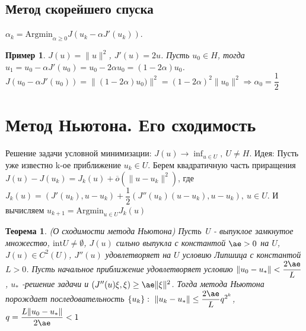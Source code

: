 \documentclass[9pt, a4paper]{extarticle}
\newtheorem*{theorem}{Теорема}
\newtheorem*{sample}{Пример}
\begin{document}
	\subsection*{Метод скорейшего спуска}
	$\alpha_k = \text{Argmin}_{\alpha \geq 0} J(u_k - \alpha J'(u_k))$. 
	\begin{sample}
		$J(u) = \|u\|^2$, $J'(u) = 2 u$. Пусть $u_0 \in H$, тогда $ u_1 = u_0 - \alpha J'(u_0) = u_0 - 2 \alpha u_0 = (1- 2\alpha) u_0$. $J(u_0 - \alpha J'(u_0)) = \|(1- 2\alpha )u_0)\|^2 = (1-2\alpha)^2 \|u_0\|^2 \Rightarrow \alpha_0 = \dfrac12$
	\end{sample}
\section{Метод Ньютона. Его сходимость}
	Решение задачи условной минимизации: $J(u) \to \inf_{u\in U}, \ U \neq H$. \newline
	Идея: Пусть уже известно k-ое приближение $u_k \in U$. Берем квадратичную часть приращения $J(u) - J(u_k) = J_k(u) + \overline{o}(\|u- u_k\|^2)$, где $J_k(u) = (J'(u_k), u - u_k) + \dfrac12 (J''(u_k)(u-u_k), u-u_k), \ u\in U$. И вычисляем $u_{k+1} = \text{Argmin}_{u\in U} J_k(u)$
	
	\begin{theorem}
		(О сходимости метода Ньютона)\newline
		Пусть U - выпуклое замкнутое множество, $\text{int} U \neq \emptyset$, $J(u)$ сильно выпукла с константой $\ae >0$ на $U$, $J(u) \in C^2(U)$, $J''(u)$ удовлетворяет на $U$ условию Липшица с константой $L> 0$. Пусть начальное приближение удовлетворяет условию $\|u_0 - u_*\| < \dfrac{2\ae}{L}$, $u_*$ -решение задачи и $(J''(u) \xi, \xi) \geq \ae \|\xi\|^2$. Тогда метода Ньютона порождает последовательность $\{u_k\}:\ \|u_k - u_*\| \leq \dfrac{2\ae}{L}q^{2^k}$, $q = \dfrac{L \|u_0 -u_*\|}{2\ae} < 1$
	\end{theorem}
\end{document}
